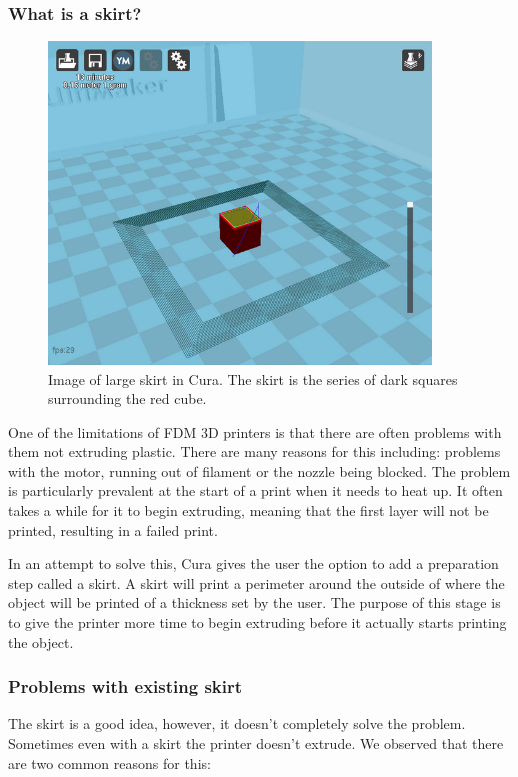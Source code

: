 \documentclass[pdftex, 11pt]{report} %
\begin{document}
\subsubsection{What is a skirt?}
\begin{figure}[H]
  \centering
  \includegraphics[width=4in]{WhatIsASkirt.png}
  \caption{Image of large skirt in Cura. The skirt is the series of dark squares surrounding the red cube.}
  \label{figure:WhatIsASkirt}
\end{figure}

One of the limitations of FDM 3D printers is that there are often problems with them not extruding plastic. There are many reasons for this including: problems with the motor, running out of filament or the nozzle being blocked. The problem is particularly prevalent at the start of a print when it needs to heat up. It often takes a while for it to begin extruding, meaning that the first layer will not be printed, resulting in a failed print.

In an attempt to solve this, Cura gives the user the option to add a preparation step called a skirt. A skirt will print a perimeter around the outside of where the object will be printed of a thickness set by the user. The purpose of this stage is to give the printer more time to begin extruding before it actually starts printing the object.

\subsubsection{Problems with existing skirt}
The skirt is a good idea, however, it doesn't completely solve the problem. Sometimes even with a skirt the printer doesn't extrude. We observed that there are two common reasons for this: 
\end{document}
